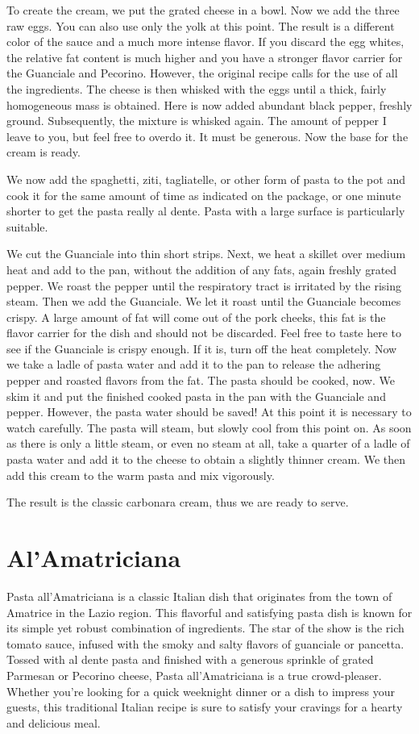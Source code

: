 To create the cream, we put the grated cheese in a bowl. Now we add the three raw eggs. You can also use only the yolk at this point. The result is a different color of the sauce and a much more intense flavor. If you discard the egg whites, the relative fat content is much higher and you have a stronger flavor carrier for the Guanciale and Pecorino. However, the original recipe calls for the use of all the ingredients. The cheese is then whisked with the eggs until a thick, fairly homogeneous mass is obtained. Here is now added abundant black pepper, freshly ground. Subsequently, the mixture is whisked again. The amount of pepper I leave to you, but feel free to overdo it. It must be generous. Now the base for the cream is ready.

We now add the spaghetti, ziti, tagliatelle, or other form of pasta to the pot and cook it for the same amount of time as indicated on the package, or one minute shorter to get the pasta really al dente. Pasta with a large surface is particularly suitable.

We cut the Guanciale into thin short strips. Next, we heat a skillet over medium heat and add to the pan, without the addition of any fats, again freshly grated pepper. We roast the pepper until the respiratory tract is irritated by the rising steam. Then we add the Guanciale. We let it roast until the Guanciale becomes crispy. A large amount of fat will come out of the pork cheeks, this fat is the flavor carrier for the dish and should not be discarded. Feel free to taste here to see if the Guanciale is crispy enough. If it is, turn off the heat completely. Now we take a ladle of pasta water and add it to the pan to release the adhering pepper and roasted flavors from the fat. The pasta should be cooked, now. We skim it and put the finished cooked pasta in the pan with the Guanciale and pepper. However, the pasta water should be saved! At this point it is necessary to watch carefully. The pasta will steam, but slowly cool from this point on. As soon as there is only a little steam, or even no steam at all, take a quarter of a ladle of pasta water and add it to the cheese to obtain a slightly thinner cream. We then add this cream to the warm pasta and mix vigorously.

The result is the classic carbonara cream, thus we are ready to serve.

\section{Al'Amatriciana}
\label{alamatriciana}
Pasta all'Amatriciana is a classic Italian dish that originates from the town of Amatrice in the Lazio region. This flavorful and satisfying pasta dish is known for its simple yet robust combination of ingredients. The star of the show is the rich tomato sauce, infused with the smoky and salty flavors of guanciale or pancetta. Tossed with al dente pasta and finished with a generous sprinkle of grated Parmesan or Pecorino cheese, Pasta all'Amatriciana is a true crowd-pleaser. Whether you're looking for a quick weeknight dinner or a dish to impress your guests, this traditional Italian recipe is sure to satisfy your cravings for a hearty and delicious meal.


